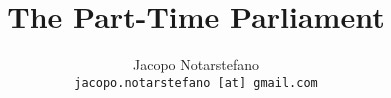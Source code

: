 \documentclass[12pt]{beamer}
\title{The Part-Time Parliament}
\author{
  Jacopo Notarstefano\\
  \texttt{jacopo.notarstefano [at] gmail.com}
}
\date{}
\begin{document}
  \begin{frame}[plain]
    \titlepage
  \end{frame}
\end{document}
